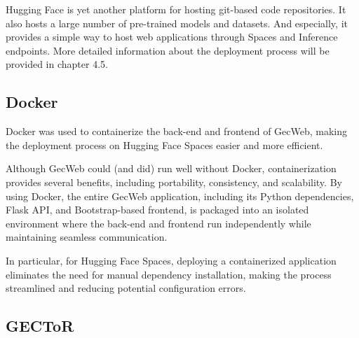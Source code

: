 Hugging Face is yet another platform for hosting git-based code repositories.
It also hosts a large number of pre-trained models and datasets.
And especially, it provides a simple way to host web applications through Spaces and Inference endpoints.
More detailed information about the deployment process will be provided in chapter 4.5.

\subsection{Docker}
\label{docker}

Docker was used to containerize the back-end and frontend of GecWeb, making the deployment process on Hugging Face Spaces easier and more efficient.

Although GecWeb could (and did) run well without Docker, containerization provides several benefits, including portability, consistency, and scalability.
By using Docker, the entire GecWeb application, including its Python dependencies, Flask API, and Bootstrap-based frontend, is packaged into an isolated environment where the back-end and frontend run independently while maintaining seamless communication.

In particular, for Hugging Face Spaces, deploying a containerized application eliminates the need for manual dependency installation, making the process streamlined and reducing potential configuration errors.

%

\subsection{GECToR}
\label{gector}

